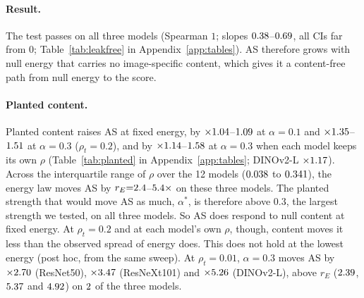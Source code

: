 \documentclass[10pt]{article}
\begin{document}
\paragraph{Result.} The test passes on all three models (Spearman $1$; slopes $0.38$--$0.69$, all CIs far from 0; Table~\ref{tab:leakfree} in Appendix~\ref{app:tables}).
AS therefore grows with null energy that carries no image-specific content, which gives it a content-free path from null energy to the score.

\paragraph{Planted content.}
Planted content raises AS at fixed energy, by $\times1.04$--$1.09$ at $\alpha{=}0.1$ and $\times1.35$--$1.51$ at $\alpha{=}0.3$ ($\rho_t{=}0.2$), and by $\times1.14$--$1.58$ at $\alpha{=}0.3$ when each model keeps its own $\rho$ (Table~\ref{tab:planted} in Appendix~\ref{app:tables}; DINOv2-L $\times1.17$).
Across the interquartile range of $\rho$ over the 12 models ($0.038$ to $0.341$), the energy law moves AS by $r_E{=}2.4$--$5.4\times$ on these three models.
The planted strength that would move AS as much, $\alpha^*$, is therefore above $0.3$, the largest strength we tested, on all three models.
So AS does respond to null content at fixed energy. At $\rho_t{=}0.2$ and at each model's own $\rho$, though, content moves it less than the observed spread of energy does.
This does not hold at the lowest energy (post hoc, from the same sweep). At $\rho_t{=}0.01$, $\alpha{=}0.3$ moves AS by $\times2.70$ (ResNet50), $\times3.47$ (ResNeXt101) and $\times5.26$ (DINOv2-L), above $r_E$ ($2.39$, $5.37$ and $4.92$) on $2$ of the three models.
\end{document}
